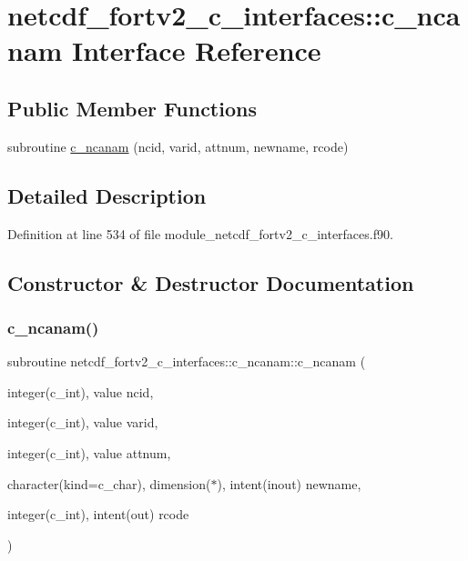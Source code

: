 \hypertarget{interfacenetcdf__fortv2__c__interfaces_1_1c__ncanam}{}\section{netcdf\+\_\+fortv2\+\_\+c\+\_\+interfaces\+:\+:c\+\_\+ncanam Interface Reference}
\label{interfacenetcdf__fortv2__c__interfaces_1_1c__ncanam}
\subsection*{Public Member Functions}
\begin{DoxyCompactItemize}
\item 
subroutine \hyperlink{interfacenetcdf__fortv2__c__interfaces_1_1c__ncanam_aba9475a22e615dd9ce8eb5ab0474a65c}{c\+\_\+ncanam} (ncid, varid, attnum, newname, rcode)
\end{DoxyCompactItemize}


\subsection{Detailed Description}


Definition at line 534 of file module\+\_\+netcdf\+\_\+fortv2\+\_\+c\+\_\+interfaces.\+f90.



\subsection{Constructor \& Destructor Documentation}
\mbox{\label{interfacenetcdf__fortv2__c__interfaces_1_1c__ncanam_aba9475a22e615dd9ce8eb5ab0474a65c}} 
\subsubsection{\texorpdfstring{c\+\_\+ncanam()}{c\_ncanam()}}
{\footnotesize\ttfamily subroutine netcdf\+\_\+fortv2\+\_\+c\+\_\+interfaces\+::c\+\_\+ncanam\+::c\+\_\+ncanam (\begin{DoxyParamCaption}\item[{integer(c\+\_\+int), value}]{ncid,  }\item[{integer(c\+\_\+int), value}]{varid,  }\item[{integer(c\+\_\+int), value}]{attnum,  }\item[{character(kind=c\+\_\+char), dimension($\ast$), intent(inout)}]{newname,  }\item[{integer(c\+\_\+int), intent(out)}]{rcode }\end{DoxyParamCaption})}




